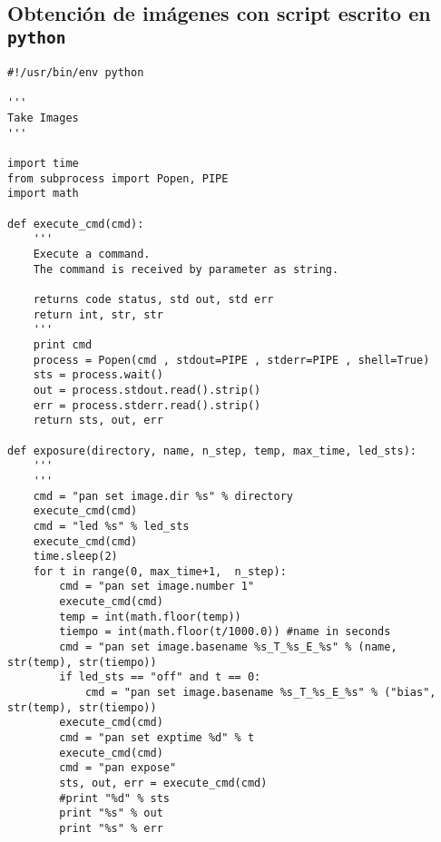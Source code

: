 \documentclass[a4paper,10pt]{article}
\begin{document}
\subsection{Obtención de imágenes con script escrito en {\tt python}}
\label{appendix:python}
{\tiny
\begin{verbatim}
#!/usr/bin/env python

'''
Take Images
'''

import time
from subprocess import Popen, PIPE
import math

def execute_cmd(cmd):
    '''
    Execute a command.
    The command is received by parameter as string.

    returns code status, std out, std err
    return int, str, str
    '''
    print cmd
    process = Popen(cmd , stdout=PIPE , stderr=PIPE , shell=True)
    sts = process.wait()
    out = process.stdout.read().strip()
    err = process.stderr.read().strip()
    return sts, out, err

def exposure(directory, name, n_step, temp, max_time, led_sts):
    '''
    '''
    cmd = "pan set image.dir %s" % directory
    execute_cmd(cmd)
    cmd = "led %s" % led_sts
    execute_cmd(cmd)
    time.sleep(2)
    for t in range(0, max_time+1,  n_step):
        cmd = "pan set image.number 1"
        execute_cmd(cmd)
        temp = int(math.floor(temp))
        tiempo = int(math.floor(t/1000.0)) #name in seconds
        cmd = "pan set image.basename %s_T_%s_E_%s" % (name, str(temp), str(tiempo))
        if led_sts == "off" and t == 0:
            cmd = "pan set image.basename %s_T_%s_E_%s" % ("bias", str(temp), str(tiempo))
        execute_cmd(cmd)
        cmd = "pan set exptime %d" % t
        execute_cmd(cmd)
        cmd = "pan expose"
        sts, out, err = execute_cmd(cmd)
        #print "%d" % sts
        print "%s" % out
        print "%s" % err




\end{verbatim}}
\end{document}
